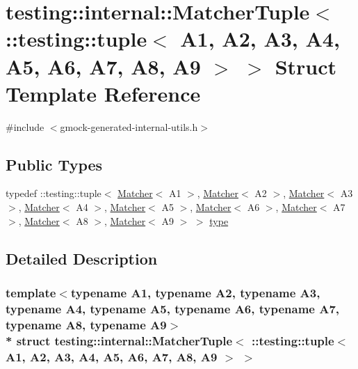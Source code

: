 \hypertarget{structtesting_1_1internal_1_1_matcher_tuple_3_01_1_1testing_1_1tuple_3_01_a1_00_01_a2_00_01_a3_05ce0d9708ffc0cc1f9fec180f9f8202e}{}\section{testing\+:\+:internal\+:\+:Matcher\+Tuple$<$ \+:\+:testing\+:\+:tuple$<$ A1, A2, A3, A4, A5, A6, A7, A8, A9 $>$ $>$ Struct Template Reference}
\label{structtesting_1_1internal_1_1_matcher_tuple_3_01_1_1testing_1_1tuple_3_01_a1_00_01_a2_00_01_a3_05ce0d9708ffc0cc1f9fec180f9f8202e}


{\ttfamily \#include $<$gmock-\/generated-\/internal-\/utils.\+h$>$}

\subsection*{Public Types}
\begin{DoxyCompactItemize}
\item 
typedef \+::testing\+::tuple$<$ \hyperlink{classtesting_1_1_matcher}{Matcher}$<$ A1 $>$, \hyperlink{classtesting_1_1_matcher}{Matcher}$<$ A2 $>$, \hyperlink{classtesting_1_1_matcher}{Matcher}$<$ A3 $>$, \hyperlink{classtesting_1_1_matcher}{Matcher}$<$ A4 $>$, \hyperlink{classtesting_1_1_matcher}{Matcher}$<$ A5 $>$, \hyperlink{classtesting_1_1_matcher}{Matcher}$<$ A6 $>$, \hyperlink{classtesting_1_1_matcher}{Matcher}$<$ A7 $>$, \hyperlink{classtesting_1_1_matcher}{Matcher}$<$ A8 $>$, \hyperlink{classtesting_1_1_matcher}{Matcher}$<$ A9 $>$ $>$ \hyperlink{structtesting_1_1internal_1_1_matcher_tuple_3_01_1_1testing_1_1tuple_3_01_a1_00_01_a2_00_01_a3_05ce0d9708ffc0cc1f9fec180f9f8202e_a022b424844dde9c01e4e40716be48f9f}{type}
\end{DoxyCompactItemize}


\subsection{Detailed Description}
\subsubsection*{template$<$typename A1, typename A2, typename A3, typename A4, typename A5, typename A6, typename A7, typename A8, typename A9$>$\\*
struct testing\+::internal\+::\+Matcher\+Tuple$<$ \+::testing\+::tuple$<$ A1, A2, A3, A4, A5, A6, A7, A8, A9 $>$ $>$}



